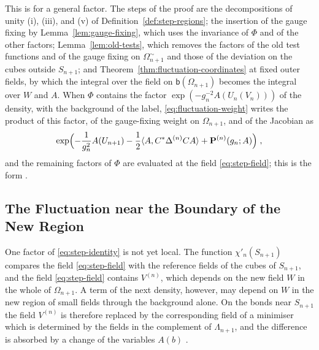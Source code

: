 \documentclass[11pt]{preprint}
\numberwithin{equation}{section}
\begin{document}
This is \cite[(3.15), (3.16), pp.~267--268]{BalabanCRE} for a general factor. The steps of the proof are the decompositions of unity (i), (iii), and (v) of Definition~\ref{def:step-regions}; the insertion of the gauge fixing by Lemma~\ref{lem:gauge-fixing}, which uses the invariance of $\Phi$ and of the other factors; Lemma~\ref{lem:old-tests}, which removes the factors of the old test functions and of the gauge fixing on $\Omega^\sim_{n+1}$ and those of the deviation on the cubes outside $S_{n+1}$; and Theorem~\ref{thm:fluctuation-coordinates} at fixed outer fields, by which the integral over the field on $\mathsf b(\Omega_{n+1})$ becomes the integral over $W$ and $A$. When $\Phi$ contains the factor $\exp(-g_n^{-2}A(U_n(V_n)))$ of the density, with the background of the label, \eqref{eq:fluctuation-weight} writes the product of this factor, of the gauge-fixing weight on $\Omega_{n+1}$, and of the Jacobian as
\begin{equation}\label{eq:step-gaussian}
    \exp\Bigl(-\frac{1}{g_n^2}A(U_{n+1}) - \frac{1}{2}\langle A, C^*\Delta^{(n)}CA\rangle + \mathbf P^{(n)}(g_n; A)\Bigr)\;,
\end{equation}
and the remaining factors of $\Phi$ are evaluated at the field \eqref{eq:step-field}; this is the form \cite[(3.15)]{BalabanCRE}.

\subsection{The Fluctuation near the Boundary of the New Region}\label{sec:boundary-change}

One factor of \eqref{eq:step-identity} is not yet local. The function $\chi'_n(S_{n+1})$ compares the field \eqref{eq:step-field} with the reference fields of the cubes of $S_{n+1}$, and the field \eqref{eq:step-field} contains $V^{(n)}$, which depends on the new field $W$ in the whole of $\Omega_{n+1}$. A term of the next density, however, may depend on $W$ in the new region of small fields through the background alone. On the bonds near $S_{n+1}$ the field $V^{(n)}$ is therefore replaced by the corresponding field of a minimiser which is determined by the fields in the complement of $\Lambda_{n+1}$, and the difference is absorbed by a change of the variables $A(b)$ \cite[pp.~251--252, 269]{BalabanCRE}.
\end{document}
